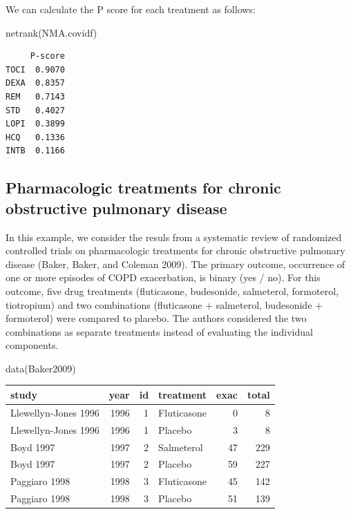 \documentclass[
  letterpaper,
  DIV=11,
  numbers=noendperiod]{scrreprt}
\newenvironment{Shaded}{\begin{snugshade}}{\end{snugshade}}
\newcommand{\FunctionTok}[1]{\textcolor[rgb]{0.28,0.35,0.67}{#1}}
\newcommand{\NormalTok}[1]{\textcolor[rgb]{0.00,0.23,0.31}{#1}}
\begin{document}
We can calculate the P score for each treatment as follows:

\begin{Shaded}
\begin{Highlighting}[]
\FunctionTok{netrank}\NormalTok{(NMA.covidf)}
\end{Highlighting}
\end{Shaded}

\begin{verbatim}
     P-score
TOCI  0.9070
DEXA  0.8357
REM   0.7143
STD   0.4027
LOPI  0.3899
HCQ   0.1336
INTB  0.1166
\end{verbatim}

\hypertarget{pharmacologic-treatments-for-chronic-obstructive-pulmonary-disease}{%
\subsection{Pharmacologic treatments for chronic obstructive pulmonary
disease}\label{pharmacologic-treatments-for-chronic-obstructive-pulmonary-disease}}

In this example, we consider the resuls from a systematic review of
randomized controlled trials on pharmacologic treatments for chronic
obstructive pulmonary disease (Baker, Baker, and Coleman 2009). The
primary outcome, occurrence of one or more episodes of COPD
exacerbation, is binary (yes / no). For this outcome, five drug
treatments (fluticasone, budesonide, salmeterol, formoterol, tiotropium)
and two combinations (fluticasone + salmeterol, budesonide + formoterol)
were compared to placebo. The authors considered the two combinations as
separate treatments instead of evaluating the individual components.

\begin{Shaded}
\begin{Highlighting}[]
\FunctionTok{data}\NormalTok{(Baker2009)}
\end{Highlighting}
\end{Shaded}

\begin{tabular}{l|r|r|l|r|r}
\hline
study & year & id & treatment & exac & total\\
\hline
Llewellyn-Jones 1996 & 1996 & 1 & Fluticasone & 0 & 8\\
\hline
Llewellyn-Jones 1996 & 1996 & 1 & Placebo & 3 & 8\\
\hline
Boyd 1997 & 1997 & 2 & Salmeterol & 47 & 229\\
\hline
Boyd 1997 & 1997 & 2 & Placebo & 59 & 227\\
\hline
Paggiaro 1998 & 1998 & 3 & Fluticasone & 45 & 142\\
\hline
Paggiaro 1998 & 1998 & 3 & Placebo & 51 & 139\\
\hline
\end{tabular}
\end{document}
